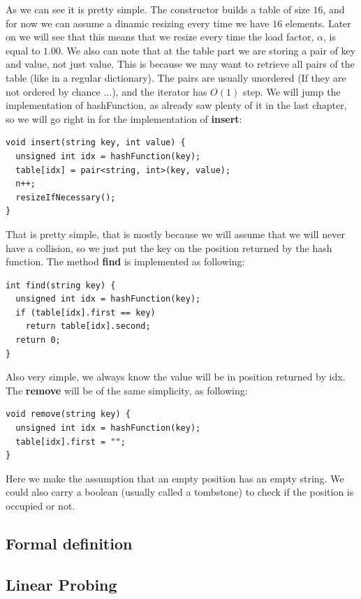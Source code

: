 As we can see it is pretty simple. The constructor builds a table of size \( 16 \), and for now we can assume a dinamic resizing every time we have \( 16 \) elements. Later on we will see that this means that we resize every time the load factor, \( \alpha \), is equal to \( 1.00 \). We also can note that at the table part we are storing a pair of key and value, not just value. This is because we may want to retrieve all pairs of the table (like in a regular dictionary). The pairs are usually unordered (If they are not ordered by chance ...), and the iterator has \( O(1) \) step. We will jump the implementation of hashFunction, as already saw plenty of it in the last chapter, so we will go right in for the implementation of \textbf{insert}:

\begin{lstlisting}
void insert(string key, int value) {
  unsigned int idx = hashFunction(key);
  table[idx] = pair<string, int>(key, value);
  n++;
  resizeIfNecessary();
}
\end{lstlisting}

That is pretty simple, that is mostly because we will assume that we will never have a collision, so we just put the key on the position returned by the hash function. The method \textbf{find} is implemented as following:

\begin{lstlisting}
int find(string key) {
  unsigned int idx = hashFunction(key);
  if (table[idx].first == key)
    return table[idx].second;
  return 0;
}
\end{lstlisting}

Also very simple, we always know the value will be in position returned by idx. The \textbf{remove} will be of the same simplicity, as following:

\begin{lstlisting}
void remove(string key) {
  unsigned int idx = hashFunction(key);
  table[idx].first = "";
}
\end{lstlisting}

Here we make the assumption that an empty position has an empty string. We could also carry a boolean (usually called a tombstone) to check if the position is occupied or not. 

\subsection{Formal definition}

\subsection{Linear Probing}

